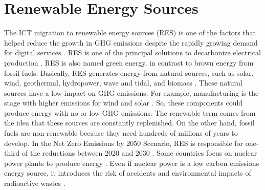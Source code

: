 
\section{Renewable Energy Sources}

The ICT migration to renewable energy sources (RES) is one of the factors that helped reduce the growth in GHG emissions despite the rapidly growing demand for digital services \cite{centres2022data}. RES is one of the principal solutions to decarbonize electrical production \cite{olabi2022renewable, rostirolla2022survey}. RES is also named green energy, in contrast to brown energy from fossil fuels. Basically, RES generates energy from natural sources, such as solar, wind, geothermal, hydropower, wave and tidal, and biomass \cite{augustine2012renewable, panwar2011role, rostirolla2022survey, UNREnewable, gross2003progress}. These natural sources have a low impact on GHG emissions. For example, manufacturing is the stage with higher emissions for wind and solar \cite{amponsah2014greenhouse}. So, these components could produce energy with no or low GHG emissions. The renewable term comes from the idea that these sources are constantly replenished. On the other hand, fossil fuels are non-renewable because they need hundreds of millions of years to develop. In the Net Zero Emissions by 2050 Scenario, RES is responsible for one-third of the reductions between 2020 and 2030 \cite{renewables2022}. Some countries focus on nuclear power plants to produce energy \cite{kunsch2014nuclear}. Even if nuclear power is a low carbon emissions energy source, it introduces the risk of accidents and environmental impacts of radioactive wastes \cite{kunsch2014nuclear}.

